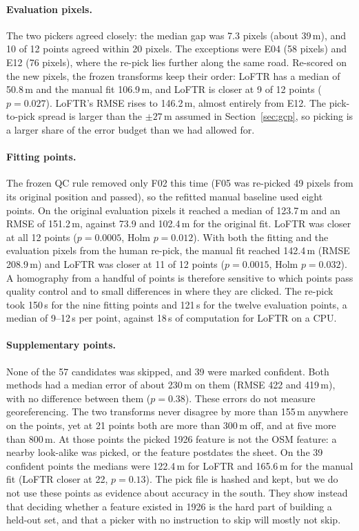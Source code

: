\documentclass[10pt,twocolumn]{article}
\newcommand{\metre}{\,m}
\begin{document}
\paragraph{Evaluation pixels.}
The two pickers agreed closely: the median gap was 7.3 pixels (about 39\metre), and 10 of 12 points agreed within 20 pixels. The exceptions were E04 (58 pixels) and E12 (76 pixels), where the re-pick lies further along the same road. Re-scored on the new pixels, the frozen transforms keep their order: LoFTR has a median of 50.8\metre{} and the manual fit 106.9\metre, and LoFTR is closer at 9 of 12 points ($p=0.027$). LoFTR's RMSE rises to 146.2\metre, almost entirely from E12. The pick-to-pick spread is larger than the $\pm27$\metre{} assumed in Section~\ref{sec:gcp}, so picking is a larger share of the error budget than we had allowed for.

\paragraph{Fitting points.}
The frozen QC rule removed only F02 this time (F05 was re-picked 49 pixels from its original position and passed), so the refitted manual baseline used eight points. On the original evaluation pixels it reached a median of 123.7\metre{} and an RMSE of 151.2\metre, against 73.9 and 102.4\metre{} for the original fit. LoFTR was closer at all 12 points ($p=0.0005$, Holm $p=0.012$). With both the fitting and the evaluation pixels from the human re-pick, the manual fit reached 142.4\metre{} (RMSE 208.9\metre) and LoFTR was closer at 11 of 12 points ($p=0.0015$, Holm $p=0.032$). A homography from a handful of points is therefore sensitive to which points pass quality control and to small differences in where they are clicked. The re-pick took 150\,s for the nine fitting points and 121\,s for the twelve evaluation points, a median of 9--12\,s per point, against 18\,s of computation for LoFTR on a CPU.

\paragraph{Supplementary points.}
None of the 57 candidates was skipped, and 39 were marked confident. Both methods had a median error of about 230\metre{} on them (RMSE 422 and 419\metre), with no difference between them ($p=0.38$). These errors do not measure georeferencing. The two transforms never disagree by more than 155\metre{} anywhere on the points, yet at 21 points both are more than 300\metre{} off, and at five more than 800\metre. At those points the picked 1926 feature is not the OSM feature: a nearby look-alike was picked, or the feature postdates the sheet. On the 39 confident points the medians were 122.4\metre{} for LoFTR and 165.6\metre{} for the manual fit (LoFTR closer at 22, $p=0.13$). The pick file is hashed and kept, but we do not use these points as evidence about accuracy in the south. They show instead that deciding whether a feature existed in 1926 is the hard part of building a held-out set, and that a picker with no instruction to skip will mostly not skip.
\end{document}
